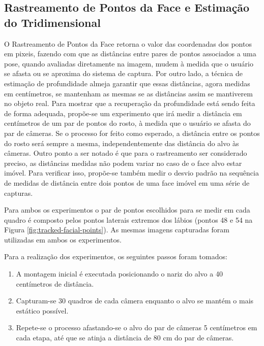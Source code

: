 \subsection{Rastreamento de Pontos da Face e Estimação do Tridimensional}

O Rastreamento de Pontos da Face retorna o valor das coordenadas dos pontos em
pixeis, fazendo com que as distâncias entre pares de pontos associados a uma
pose, quando avaliadas diretamente na imagem, mudem à medida que o usuário se
afasta ou se aproxima do sistema de captura. Por outro lado, a técnica de
estimação de profundidade almeja garantir que essas distâncias, agora medidas em
centímetros, se mantenham as mesmas se as distâncias assim se mantiverem no
objeto real. Para mostrar que a recuperação da profundidade está sendo feita de
forma adequada, propõe-se um experimento que irá medir a distância em
centímetros de um par de pontos do rosto, à medida que o usuário se afasta do
par de câmeras. Se o processo for feito como esperado, a distância entre os
pontos do rosto será sempre a mesma, independentemente das distância do alvo às
câmeras.  Outro ponto a ser notado é que para o rastreamento ser considerado
preciso, as distâncias medidas não podem variar no caso de o face alvo estar
imóvel. Para verificar isso, propõe-se também medir o desvio padrão na sequência
de medidas de distância entre dois pontos de uma face imóvel em uma série de
capturas.


Para ambos os experimentos o par de pontos escolhidos para se medir em cada
quadro é composto pelos pontos laterais extremos dos lábios (pontos 48 e 54 na
Figura \ref{fig:tracked-facial-points}). As mesmas imagens capturadas foram
utilizadas em ambos os experimentos.

Para a realização dos experimentos, os seguintes passos foram tomados:

\begin{enumerate}
      
\item A montagem inicial é executada posicionando o nariz do alvo a 40
  centímetros de distância.

\item Capturam-se 30 quadros de cada câmera enquanto o alvo se mantém o mais
  estático possível.

\item Repete-se o processo afastando-se o alvo do par de câmeras 5 centímetros
  em cada etapa, até que se atinja a distância de 80 cm do par de câmeras.

\end{enumerate}

